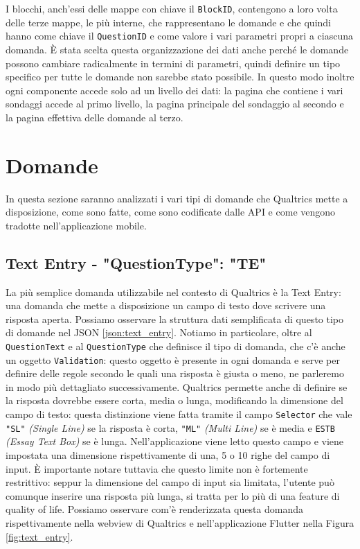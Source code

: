 I blocchi, anch'essi delle mappe con chiave il \texttt{BlockID}, contengono a loro volta delle terze mappe, le più interne, che rappresentano le domande e che quindi hanno come chiave il \texttt{QuestionID} e come valore i vari parametri propri a ciascuna domanda.
È stata scelta questa organizzazione dei dati anche perché le domande possono cambiare radicalmente in termini di parametri, quindi definire un tipo specifico per tutte le domande non sarebbe stato possibile. In questo modo inoltre ogni componente accede solo ad un livello dei dati: la pagina che contiene i vari sondaggi accede al primo livello, la pagina principale del sondaggio al secondo e la pagina effettiva delle domande al terzo.

\section{Domande}
In questa sezione saranno analizzati i vari tipi di domande che Qualtrics mette a disposizione, come sono fatte, come sono codificate dalle API e come vengono tradotte nell'applicazione mobile.

\subsection{Text Entry - "QuestionType": "TE"}
La più semplice domanda utilizzabile nel contesto di Qualtrics è la Text Entry: una domanda che mette a disposizione un campo di testo dove scrivere una risposta aperta.
Possiamo osservare la struttura dati semplificata di questo tipo di domande nel JSON \ref{json:text_entry}. Notiamo in particolare, oltre al \texttt{QuestionText} e al \texttt{QuestionType} che definisce il tipo di domanda, che c'è anche un oggetto \texttt{Validation}: questo oggetto è presente in ogni domanda e serve per definire delle regole secondo le quali una risposta è giusta o meno, ne parleremo in modo più dettagliato successivamente.
Qualtrics permette anche di definire se la risposta dovrebbe essere corta, media o lunga, modificando la dimensione del campo di testo: questa distinzione viene fatta tramite il campo \texttt{Selector} che vale \texttt{"SL"} \textit{(Single Line)} se la risposta è corta, \texttt{"ML"} \textit{(Multi Line)} se è media e \texttt{ESTB} \textit{(Essay Text Box)} se è lunga. Nell'applicazione viene letto questo campo e viene impostata una dimensione rispettivamente di una, 5 o 10 righe del campo di input. È importante notare tuttavia che questo limite non è fortemente restrittivo: seppur la dimensione del campo di input sia limitata, l'utente può comunque inserire una risposta più lunga, si tratta per lo più di una feature di quality of life. Possiamo osservare com'è renderizzata questa domanda rispettivamente nella webview di Qualtrics e nell'applicazione Flutter nella Figura \ref{fig:text_entry}.

